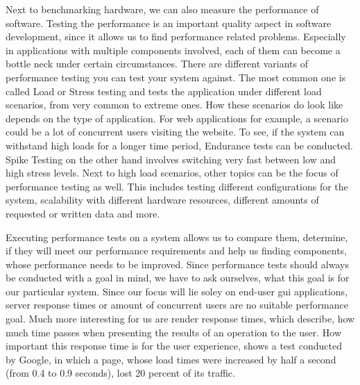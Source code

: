 Next to benchmarking hardware, we can also measure the performance of software.
Testing the performance is an important quality aspect in software development,
since it allows us to find performance related problems. Especially in
applications with multiple components involved, each of them can become a bottle
neck under certain circumstances. There are different variants of performance
testing you can test your system against. The most common one is called Load or
Stress testing and tests the application under different load scenarios, from
very common to extreme ones. How these scenarios do look like depends on the
type of application. For web applications for example, a scenario could be
a lot of concurrent users visiting the website. To see, if the system can
withstand high loads for a longer time period, Endurance tests can be conducted.
Spike Testing on the other hand involves switching very fast between low and
high stress levels. Next to high load scenarios, other topics can be the focus
of performance testing as well. This includes testing different configurations
for the system, scalability with different hardware resources, different amounts
of requested or written data and more.

Executing performance tests on a system allows us to compare them, determine, if
they will meet our performance requirements and help us finding components,
whose performance needs to be improved. Since performance tests should always be
conducted with a goal in mind, we have to ask ourselves, what this goal is for
our particular system. Since our focus will lie soley on end-user \gls{gui}
applications, server response times or amount of concurrent users are no
suitable performance goal. Much more interesting for us are render response
times, which describe, how much time passes when presenting the results of an
operation to the user. How important this response time is for the user
experience, shows a test conducted by Google, in which a page, whose load times
were increased by half a second (from 0.4 to 0.9 seconds), lost 20 percent of
its traffic.
\cite{SoftwarePerformanceTesting, RenderResponseTimes, PerformanceIsAFeature}

